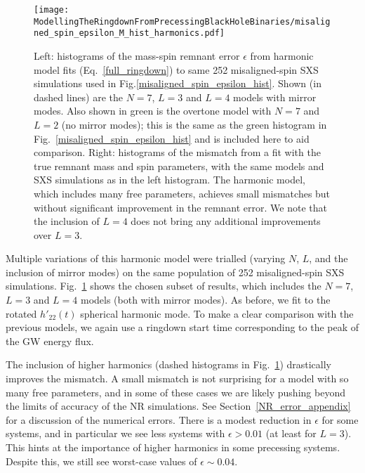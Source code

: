 \begin{figure}[t]
    \centering
    \texttt{[image: ModellingTheRingdownFromPrecessingBlackHoleBinaries/misaligned\_spin\_epsilon\_M\_hist\_harmonics.pdf]}
    \caption[Remnant error and mismatches for fits to misaligned-spin SXS simulations using the harmonic model]{Left: histograms of the mass-spin remnant error $\epsilon$ from harmonic model fits (Eq.~\ref{full_ringdown}) to same 252 misaligned-spin SXS simulations used in Fig.\ref{misaligned_spin_epsilon_hist}. Shown (in dashed lines) are the $N=7$, $L=3$ and $L=4$ models with mirror modes. Also shown in green is the overtone model with $N=7$ and $L=2$ (no mirror modes); this is the same as the green histogram in Fig.~\ref{misaligned_spin_epsilon_hist} and is included here to aid comparison. Right: histograms of the mismatch from a fit with the true remnant mass and spin parameters, with the same models and SXS simulations as in the left histogram. The harmonic model, which includes many free parameters, achieves small mismatches but without significant improvement in the remnant error. We note that the inclusion of $L=4$ does not bring any additional improvements over $L=3$.}
    \label{misaligned_spin_epsilon_hist_harmonics}
\end{figure}

Multiple variations of this harmonic model were trialled (varying $N$, $L$, and the inclusion of mirror modes) on the same population of 252 misaligned-spin SXS simulations.
Fig.~\ref{misaligned_spin_epsilon_hist_harmonics} shows the chosen subset of results, which includes the $N=7$, $L=3$ and $L=4$ models (both with mirror modes). As before, we fit to the rotated $h'_{22}(t)$ spherical harmonic mode.
To make a clear comparison with the previous models, we again use a ringdown start time corresponding to the peak of the GW energy flux.

The inclusion of higher harmonics (dashed histograms in Fig.~\ref{misaligned_spin_epsilon_hist_harmonics}) drastically improves the mismatch.
A small mismatch is not surprising for a model with so many free parameters, and in some of these cases we are likely pushing beyond the limits of accuracy of the NR simulations. See Section~\ref{NR_error_appendix} for a discussion of the numerical errors.
There is a modest reduction in $\epsilon$ for some systems, and in particular we see less systems with $\epsilon > 0.01$ (at least for $L=3$). This hints at the importance of higher harmonics in some precessing systems. Despite this, we still see worst-case values of $\epsilon \sim 0.04$.


